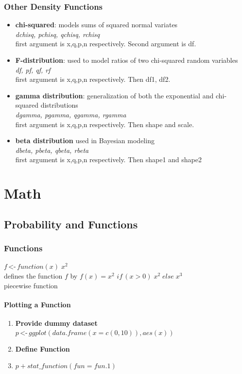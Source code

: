 \documentclass[openany]{book}
\begin{document}
\begin{flushleft}
\subsection{Other Density Functions}
\begin{itemize}
\item \textbf{chi-squared}: models sums of squared normal variates\\
\textit{dchisq, pchisq, qchisq, rchisq} \\
 first argument is x,q,p,n respectively. Second argument is df.
\item \textbf{F-distribution}: used to model ratios of two chi-squared random variables\\
\textit{df, pf, qf, rf}\\
first argument is x,q,p,n respectively. Then df1, df2.
\item \textbf{gamma distribution}: generalization of both the exponential and chi-squared distributions\\
\textit{dgamma, pgamma, qgamma, rgamma}\\
first argument is x,q,p,n respectively. Then shape and scale.
\item \textbf{beta distribution} used in Bayesian modeling \\
\textit{dbeta, pbeta, qbeta, rbeta}\\
first argument is x,q,p,n respectively. Then shape1 and shape2
\end{itemize}
\chapter{Math}
\section{Probability and Functions}
\subsection{Functions}
$f\, \texttt{<-}\, function(x)\; x^2$\\
defines the function $f$ by $f(x)=x^2$\medbreak
$if \, (x>0) \; x^2 \; else \; x^3$\\
piecewise function
\subsubsection{Plotting a Function}
\begin{enumerate}
\item \textbf{Provide dummy dataset}\\
 $p \,\texttt{<-}\, ggplot(data.frame(x = c(0, 10)), aes(x))$
 \item \textbf{Define Function}
 \item $p + stat\_function(fun = fun.1)$
\end{enumerate}

\end{flushleft}
\end{document}
